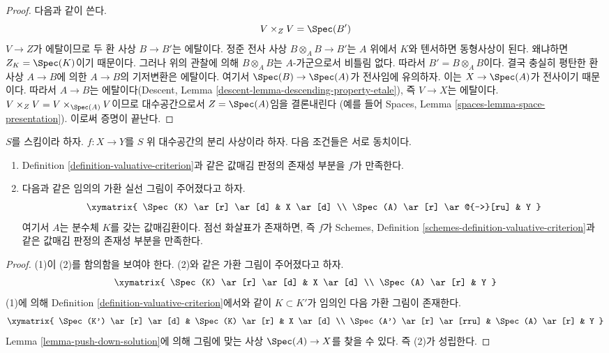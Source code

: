 \begin{proof}
다음과 같이 쓴다.
$$
V \times_Z V = \Spec(B')
$$
$V \to Z$가 에탈이므로 두 환 사상 $B \to B'$는 에탈이다.
정준 전사 사상 $B \otimes_A B \to B'$는 $A$ 위에서 $K$와 텐서하면
동형사상이 된다. 왜냐하면 $Z_K = \Spec(K)$이기 때문이다.
그러나 위의 관찰에 의해 $B \otimes_A B$는 $A$-가군으로서 비틀림 없다.
따라서 $B' = B \otimes_A B$이다.
결국 충실히 평탄한 환 사상 $A \to B$에 의한 $A \to B$의
기저변환은 에탈이다. 여기서 $\Spec(B) \to \Spec(A)$가 전사임에
유의하자. 이는 $X \to \Spec(A)$가 전사이기 때문이다.
따라서 $A \to B$는 에탈이다(Descent, Lemma
\ref{descent-lemma-descending-property-etale}), 즉 $V \to X$는 에탈이다.
$V \times_Z V = V \times_{\Spec(A)} V$이므로
대수공간으로서 $Z = \Spec(A)$임을 결론내린다
(예를 들어 Spaces, Lemma \ref{spaces-lemma-space-presentation}).
이로써 증명이 끝난다.
\end{proof}






\begin{lemma}
\label{lemma-usual-enough}
$S$를 스킴이라 하자. $f : X \to Y$를 $S$ 위 대수공간의 분리 사상이라 하자.
다음 조건들은 서로 동치이다.
\begin{enumerate}
\item Definition \ref{definition-valuative-criterion}과 같은
값매김 판정의 존재성 부분을 $f$가 만족한다.
\item 다음과 같은 임의의 가환 실선 그림이 주어졌다고 하자.
$$
\xymatrix{
\Spec(K) \ar[r] \ar[d] & X \ar[d] \\
\Spec(A) \ar[r] \ar@{-->}[ru] & Y
}
$$
여기서 $A$는 분수체 $K$를 갖는 값매김환이다. 점선 화살표가 존재하면,
즉 $f$가 Schemes, Definition
\ref{schemes-definition-valuative-criterion}과 같은 값매김 판정의
존재성 부분을 만족한다.
\end{enumerate}
\end{lemma}

\begin{proof}
(1)이 (2)를 함의함을 보여야 한다. (2)와 같은 가환 그림이 주어졌다고 하자.
$$
\xymatrix{
\Spec(K) \ar[r] \ar[d] & X \ar[d] \\
\Spec(A) \ar[r] & Y
}
$$
(1)에 의해 Definition \ref{definition-valuative-criterion}에서와 같이
$K \subset K'$가 임의인 다음 가환 그림이 존재한다.
$$
\xymatrix{
\Spec(K') \ar[r] \ar[d] & \Spec(K) \ar[r] & X \ar[d] \\
\Spec(A') \ar[r] \ar[rru] & \Spec(A) \ar[r] & Y
}
$$
Lemma \ref{lemma-push-down-solution}에 의해 그림에 맞는 사상
$\Spec(A) \to X$를 찾을 수 있다. 즉 (2)가 성립한다.
\end{proof}


